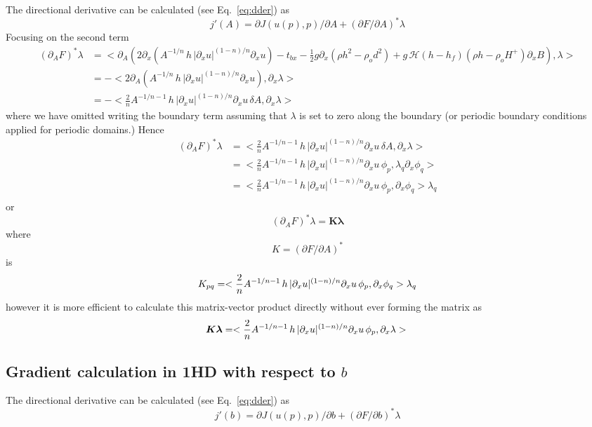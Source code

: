 \documentclass[10pt,a4paper]{book}
\newcommand{\He}{\mathcal{H}}
\newcommand{\p}{\partial}
\newcommand{\tbx}{t_{bx}}
\begin{document}
The directional derivative can be calculated (see Eq.~\ref{eq:dder}) as
\begin{equation}
j'(A)= \p J(u(p),p)/ \p A + (\p F / \p A)^\ast  \lambda
\label{eq:dder2}
\end{equation}
Focusing on the second term
\begin{align*}
  (\p_A F )^\ast  \lambda & = <\p_A  \left ( 2 \p_x ( A^{-1/n} \, h \, | \p_x u|^{(1-n)/n}   \p_x u ) - \tbx - \frac{1}{2} g \p_x (\rho h^2 - \rho_o d^2)+ g\,\He(h-h_f) (\rho h -\rho_o H^{+}) \p_x B \right ) , \lambda>\\
                             & = - <  2 \p_A \left ( A^{-1/n} \, h \, | \p_x u|^{(1-n)/n}   \p_x u \right ) , \p_x \lambda>\\
                             & = - <  \frac{2}{n}  A^{-1/n-1} \, h \, | \p_x u|^{(1-n)/n}   \p_x u \, \delta A, \p_x \lambda>
\end{align*}
where we have omitted writing the boundary term assuming that
$\lambda$ is set to zero along the boundary (or periodic boundary
conditions applied for periodic domains.)
Hence
\begin{align*}
  (\p_A F )^{\ast} \lambda &= <  \frac{2}{n}  A^{-1/n-1} \, h \, | \p_x u|^{(1-n)/n}   \p_x u \, \delta A, \p_x \lambda> \\
            &=    <  \frac{2}{n}  A^{-1/n-1} \, h \, | \p_x u|^{(1-n)/n}   \p_x u \, \phi_p, \lambda_q \p_x \phi_q> \\
            &=    <  \frac{2}{n}  A^{-1/n-1} \, h \, | \p_x u|^{(1-n)/n}   \p_x u \, \phi_p, \p_x \phi_q>  \lambda_q \\
\end{align*}
or
 \[
 (\p_A F )^{\ast} \lambda = \bm{K} \bm{\lambda}
\]
where
\[
K= (\p F /\p A)^{\ast} 
\]
is
\[
K_{pq}=<  \frac{2}{n}  A^{-1/n-1} \, h \, | \p_x u|^{(1-n)/n}   \p_x u \, \phi_p,  \p_x \phi_q>  \lambda_q \\
\]
however it is more efficient to calculate this matrix-vector product
directly without ever forming the matrix as
\[
  \bm{K} \bm{\lambda}= <  \frac{2}{n}  A^{-1/n-1} \, h \, | \p_x u|^{(1-n)/n}   \p_x u \, \phi_p, \p_x \lambda> \\
\]



\subsection{Gradient calculation in 1HD with respect to $b$}


The directional derivative can be calculated (see Eq.~\ref{eq:dder}) as
\begin{equation}
j'(b)= \p J(u(p),p)/ \p b + (\p F / \p b)^\ast  \lambda
\label{eq:dder2}
\end{equation}
\end{document}

